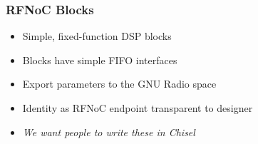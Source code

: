 \documentclass{beamer}
\begin{document}
\begin{frame}
\frametitle{RFNoC Blocks}
\begin{itemize}
\item Simple, fixed-function DSP blocks
\item Blocks have simple FIFO interfaces
\item Export parameters to the GNU Radio space
\item Identity as RFNoC endpoint transparent to designer
\item<2-> \emph{We want people to write these in Chisel}
\end{itemize}
\end{frame}
\end{document}

